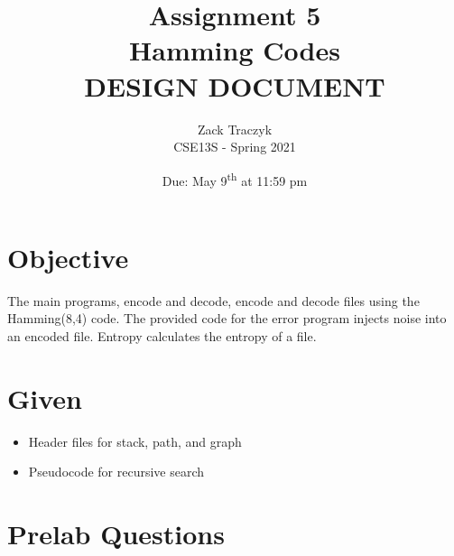 \documentclass[12pt]{article}
\title{%
    \textbf{Assignment 5 \\ 
        Hamming Codes \\
\large DESIGN DOCUMENT} }
\author{Zack Traczyk \\ CSE13S - Spring 2021}
\date{Due: May 9\textsuperscript{th} at 11:59 pm}
\begin{document}
\maketitle

\section{Objective}

The main programs, encode and decode, encode and decode files using the
Hamming(8,4) code.
The provided code for the error program injects noise into an encoded file.
Entropy calculates the entropy of a file.


\section{Given}

\begin{itemize}
    \item{Header files for stack, path, and graph}
    \item{Pseudocode for recursive search}
\end{itemize}


\section{Prelab Questions}
\end{document}
